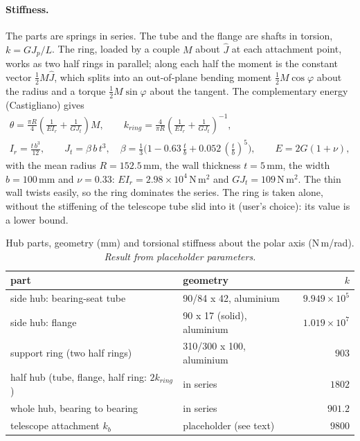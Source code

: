 \documentclass[10pt,a4paper]{article}
\numberwithin{equation}{section}
\begin{document}
\paragraph{Stiffness.} The parts are springs in series. The tube and the flange are shafts in torsion, $k = G J_p/L$. The ring, loaded by a couple $M$ about $\hat J$ at each attachment point, works as two half rings in parallel; along each half the moment is the constant vector $\tfrac12 M\hat J$, which splits into an out-of-plane bending moment $\tfrac12 M\cos\varphi$ about the radius and a torque $\tfrac12 M\sin\varphi$ about the tangent. The complementary energy (Castigliano) gives
\begin{gather}
\theta = \frac{\pi R}{4}\left(\frac{1}{E I_r} + \frac{1}{G J_t}\right) M,\qquad k_{ring} = \frac{4}{\pi R}\left(\frac{1}{E I_r} + \frac{1}{G J_t}\right)^{-1},\\
I_r = \frac{t\,b^3}{12},\qquad J_t = \beta\,b\,t^3,\quad \beta = \tfrac13\bigl(1 - 0.63\,\tfrac tb + 0.052\,(\tfrac tb)^5\bigr),\qquad E = 2G(1 + \nu),
\end{gather}
with the mean radius $R = 152.5$\,mm, the wall thickness $t = 5$\,mm, the width $b = 100$\,mm and $\nu = 0.33$: $E I_r = 2.98\times10^{4}$\,N\,m$^2$ and $G J_t = 109$\,N\,m$^2$. The thin wall twists easily, so the ring dominates the series. The ring is taken alone, without the stiffening of the telescope tube slid into it (user's choice): its value is a lower bound.
\begin{table}[H]\centering\small
\caption{Hub parts, geometry (mm) and torsional stiffness about the polar axis (N\,m/rad). \emph{Result from placeholder parameters.}}\label{tab:hub_parts}
\begin{tabular}{llr}\toprule
part & geometry & $k$ \\ \midrule
side hub: bearing-seat tube & 90/84 x 42, aluminium & $9.949\times10^{5}$ \\
side hub: flange & 90 x 17 (solid), aluminium & $1.019\times10^{7}$ \\
support ring (two half rings) & 310/300 x 100, aluminium & $903$ \\
\midrule
half hub (tube, flange, half ring: $2k_{ring}$) & in series & $1802$ \\
whole hub, bearing to bearing & in series & $901.2$ \\
telescope attachment $k_b$ & placeholder (see text) & $9800$ \\
\bottomrule\end{tabular}\end{table}
\end{document}
